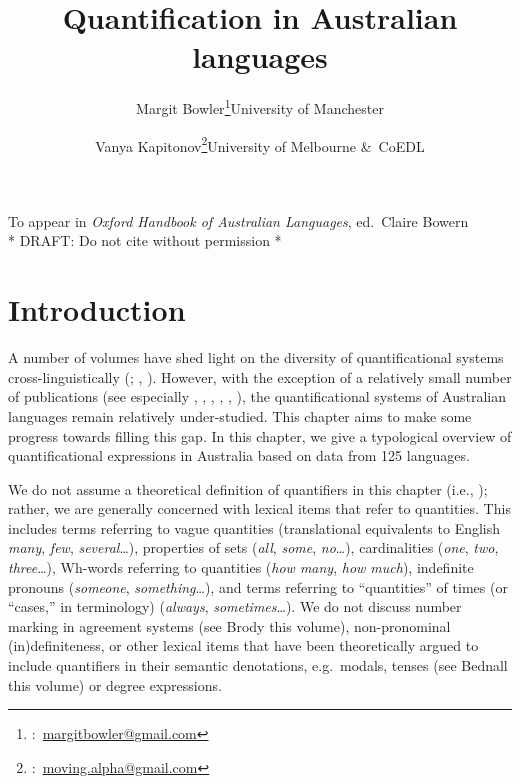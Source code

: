 \documentclass[12pt,egregdoesnotlikesansseriftitles]{scrartcl}
\title{Quantification in Australian languages}
\author{Margit Bowler\thanks{\Letter:~\href{mailto:margitbowler@gmail.com}{margitbowler@gmail.com}}\authorcr University of Manchester \and \vspace{-.5cm}Vanya Kapitonov\thanks{\Letter:~\href{mailto:moving.alpha@gmail.com}{moving.alpha@gmail.com}}\authorcr University of Melbourne \&\ CoEDL}
\begin{document}
\maketitle

\begin{center}
To appear in \textit{Oxford Handbook of Australian Languages}, ed.\ Claire Bowern\\
* DRAFT: Do not cite without permission *
\end{center}

\section{Introduction}

A number of volumes have shed light on the diversity of quantificational systems cross-linguistically (\citealt{keenanpaperno17,keenanpaperno12};  \citealt{qclp08}, \citealt{bachetal95}). However, with the exception of a relatively small number of publications (see especially \citealt{bowler17}, \citealt{bowernzentz12}, \citealt{alpher01},  \citealt{bittnerhale95}, \citealt{evans95}, \citealt{laughren81}), the quantificational systems of Australian languages remain relatively under-studied. This chapter aims to make some progress towards filling this gap. In this chapter, we give a typological overview of quantificational expressions in Australia based on data from 125 languages.

We do not assume a theoretical definition of quantifiers in this chapter (i.e., \citealt{heimkratzer98}); rather, we are generally concerned with lexical items that refer to quantities. This includes terms referring to vague quantities (translational equivalents to English \textit{many}, \textit{few}, \textit{several}\ldots), properties of sets (\textit{all}, \textit{some}, \textit{no}\ldots), cardinalities (\textit{one}, \textit{two}, \textit{three}\ldots), Wh-words referring to quantities (\textit{how many}, \textit{how much}), indefinite pronouns (\textit{someone}, \textit{something}\ldots), and terms referring to ``quantities'' of times (or ``cases,'' in  terminology) (\textit{always}, \textit{sometimes}\ldots). We do not discuss number marking in agreement systems (see Brody this volume), non-pronominal (in)definiteness, or other lexical items that have been theoretically argued to include quantifiers in their semantic denotations, e.g.\ modals, tenses (see Bednall this volume) or degree expressions.
\end{document}
